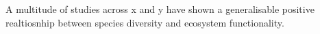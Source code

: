 \begin{refsection}



\chapter{\chaptertitle}
\label{ch:befr}

A multitude of studies across x and y have shown a generalisable positive realtiosnhip between species diversity and ecosystem functionality.

\testvar{}

\newpage{}
\begingroup
{}
\printbibliography[heading=subbibintoc]
\endgroup

\end{refsection}

